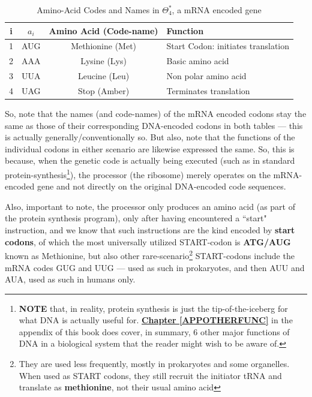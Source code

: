 \documentclass[a4paper, 18pt]{book} %
\begin{document}
\begin{table}[h]
  \centering
  \Large
	\begin{tabular}[t]{|c|c|c|p{3cm}|}
	\hline
	i & $a_i$ & \textbf{Amino Acid (Code-name)} & \textbf{Function}\\
	\hline
	\hline
	1 & AUG & Methionine (Met) & Start Codon: initiates translation\\
	\hline
	2 & AAA & Lysine (Lys) & Basic amino acid\\
	\hline
	3 & UUA & Leucine (Leu) & Non polar amino acid\\
	\hline
	4 & UAG & Stop (Amber) & Terminates translation\\
	
	\hline
	              
\end{tabular}
 \caption{Amino-Acid Codes and Names in $\Theta_4^*$, a mRNA encoded gene}
  \label{TAB2}
\end{table}

So, note that the names (and code-names) of the mRNA encoded codons stay the same as those of their corresponding DNA-encoded codons in both tables --- this is actually generally/conventionally so. But also, note that the functions of the individual codons in either scenario are likewise expressed the same. So, this is because, when the genetic code is actually being executed (such as in standard protein-synthesis\footnote{\textbf{NOTE} that, in reality, protein synthesis is just the tip-of-the-iceberg for what DNA is actually useful for. \textbf{\hyperref[APPOTHERFUNC]{Chapter  \ref{APPOTHERFUNC}}} in the appendix of this book does cover, in summary, 6 other major functions of DNA in a biological system that the reader might wish to be aware of.}), the processor (the ribosome) merely operates on the mRNA-encoded gene and not directly on the original DNA-encoded code sequences.

Also, important to note, the processor only produces an amino acid (as part of the protein synthesis program), only after having encountered a ``start" instruction, and we know that such instructions are the kind encoded by \textbf{start codons}, of which the most universally utilized START-codon is \textbf{ATG/AUG} known as Methionine, but also other rare-scenario\footnote{They are used less frequently, mostly in prokaryotes and some organelles. When used as START codons, they still recruit the initiator tRNA and translate as \textbf{methionine}, not their usual amino acid\cite{copilot_dna_assistant}} START-codons include the mRNA codes GUG and UUG --- used as such in prokaryotes, and then AUU and AUA, used as such in humans only. 
\end{document}
